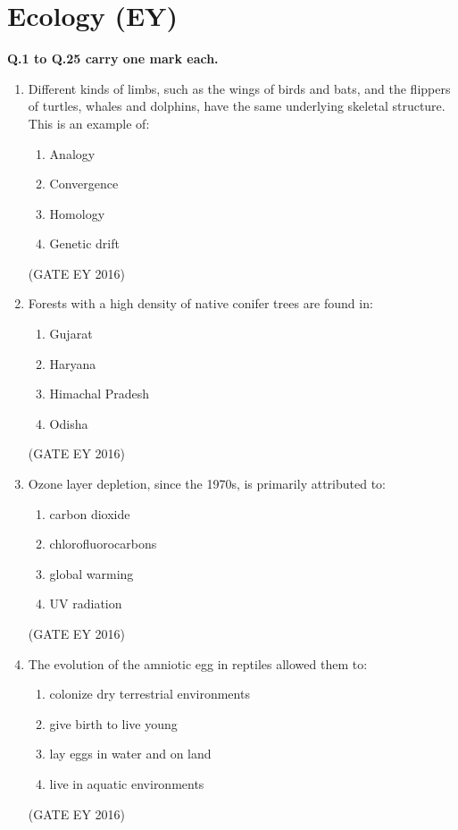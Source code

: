 \documentclass[journal]{IEEEtran}
\begin{document}
\section*{\textbf{Ecology (EY)}}
\begin{flushleft}
\textbf{Q.1 to Q.25 carry one mark each.}
    \end{flushleft}
\begin{enumerate}[label=Q.\arabic*.]

\item Different kinds of limbs, such as the wings of birds and bats, and the flippers of turtles, whales and dolphins, have the same underlying skeletal structure. This is an example of:
\begin{multicols}{4}
\begin{enumerate}
    \item Analogy
    \item Convergence
    \item Homology
    \item Genetic drift
\end{enumerate}
\end{multicols}
\hfill{(GATE EY 2016)}

\item Forests with a high density of native conifer trees are found in:
\begin{multicols}{2}
\begin{enumerate}
    \item Gujarat
    \item Haryana
    \item Himachal Pradesh
    \item Odisha
\end{enumerate}
\end{multicols}
\hfill{(GATE EY 2016)}

\item Ozone layer depletion, since the 1970s, is primarily attributed to:
\begin{multicols}{2}
\begin{enumerate}
    \item carbon dioxide
    \item chlorofluorocarbons
    \item global warming
    \item UV radiation
\end{enumerate}
\end{multicols}
\hfill{(GATE EY 2016)}

\item The evolution of the amniotic egg in reptiles allowed them to:
\begin{enumerate}
    \item colonize dry terrestrial environments
    \item give birth to live young
    \item lay eggs in water and on land
    \item live in aquatic environments
\end{enumerate}
\hfill{(GATE EY 2016)}


\end{enumerate}
\end{document}
